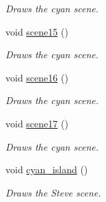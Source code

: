 \begin{DoxyCompactItemize}
\begin{DoxyCompactList}\small\item\em Draws the cyan scene. \end{DoxyCompactList}\item 
void \hyperlink{classcutscene1_a2e175a494e93ec627d314f6372a6578c}{scene15} ()
\begin{DoxyCompactList}\small\item\em Draws the cyan scene. \end{DoxyCompactList}\item 
void \hyperlink{classcutscene1_a4a414fd614b2d835107d9d8713d1e539}{scene16} ()
\begin{DoxyCompactList}\small\item\em Draws the cyan scene. \end{DoxyCompactList}\item 
void \hyperlink{classcutscene1_a9706ac15030f2831ecf326894a5031c5}{scene17} ()
\begin{DoxyCompactList}\small\item\em Draws the cyan scene. \end{DoxyCompactList}\item 
void \hyperlink{classcutscene1_a23a6a1aa9b24d60b5362e958e724c465}{cyan\+\_\+island} ()
\begin{DoxyCompactList}\small\item\em Draws the Steve scene. \end{DoxyCompactList}\end{DoxyCompactItemize}
